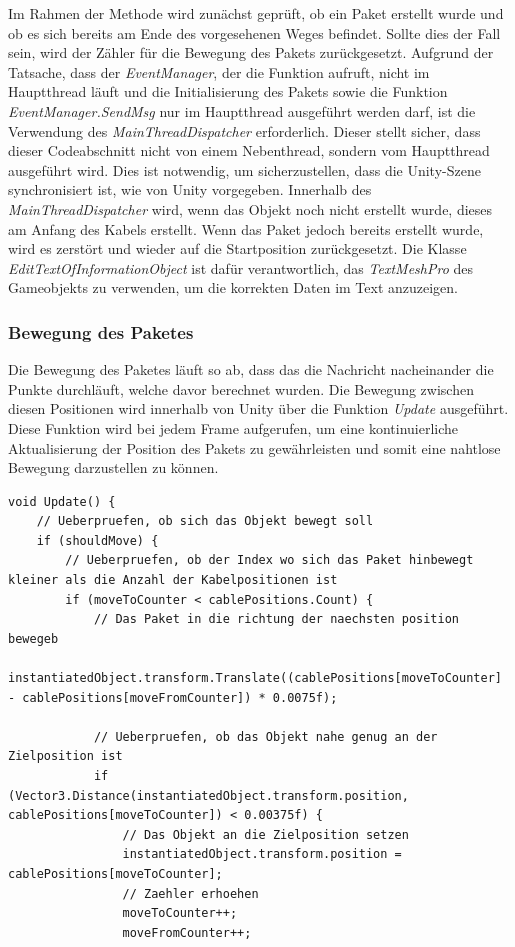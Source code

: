 \begin{itemize}
    Im Rahmen der Methode wird zunächst geprüft, ob ein Paket erstellt wurde und ob es sich bereits am Ende des vorgesehenen Weges befindet. Sollte dies der Fall sein, wird der Zähler für die Bewegung des Pakets zurückgesetzt. Aufgrund der Tatsache, dass der \textit{EventManager}, der die Funktion aufruft, nicht im Hauptthread läuft und die Initialisierung des Pakets sowie die Funktion \textit{EventManager.SendMsg} nur im Hauptthread ausgeführt werden darf, ist die Verwendung des \textit{MainThreadDispatcher} erforderlich. Dieser stellt sicher, dass dieser Codeabschnitt nicht von einem Nebenthread, sondern vom Hauptthread ausgeführt wird. Dies ist notwendig, um sicherzustellen, dass die Unity-Szene synchronisiert ist, wie von Unity vorgegeben. Innerhalb des \textit{MainThreadDispatcher} wird, wenn das Objekt noch nicht erstellt wurde, dieses am Anfang des Kabels erstellt. Wenn das Paket jedoch bereits erstellt wurde, wird es zerstört und wieder auf die Startposition zurückgesetzt. Die Klasse \textit{EditTextOfInformationObject} ist dafür verantwortlich, das \textit{TextMeshPro} des Gameobjekts zu verwenden, um die korrekten Daten im Text anzuzeigen.


    \subsubsection{Bewegung des Paketes}
    Die Bewegung des Paketes läuft so ab, dass das die Nachricht nacheinander die Punkte durchläuft, welche davor berechnet wurden. Die Bewegung zwischen diesen Positionen wird innerhalb von Unity über die Funktion \textit{Update} ausgeführt. Diese Funktion wird bei jedem Frame aufgerufen, um eine kontinuierliche Aktualisierung der Position des Pakets zu gewährleisten und somit eine nahtlose Bewegung darzustellen zu können.
    \begin{lstlisting}[style=csharp, caption={Update Funktion}, label=code:Update]
void Update() {
    // Ueberpruefen, ob sich das Objekt bewegt soll
    if (shouldMove) {
        // Ueberpruefen, ob der Index wo sich das Paket hinbewegt kleiner als die Anzahl der Kabelpositionen ist
        if (moveToCounter < cablePositions.Count) {
            // Das Paket in die richtung der naechsten position bewegeb
            instantiatedObject.transform.Translate((cablePositions[moveToCounter] - cablePositions[moveFromCounter]) * 0.0075f);

            // Ueberpruefen, ob das Objekt nahe genug an der Zielposition ist
            if (Vector3.Distance(instantiatedObject.transform.position, cablePositions[moveToCounter]) < 0.00375f) {
                // Das Objekt an die Zielposition setzen
                instantiatedObject.transform.position = cablePositions[moveToCounter];
                // Zaehler erhoehen
                moveToCounter++;
                moveFromCounter++;


\end{lstlisting}
\end{itemize}
